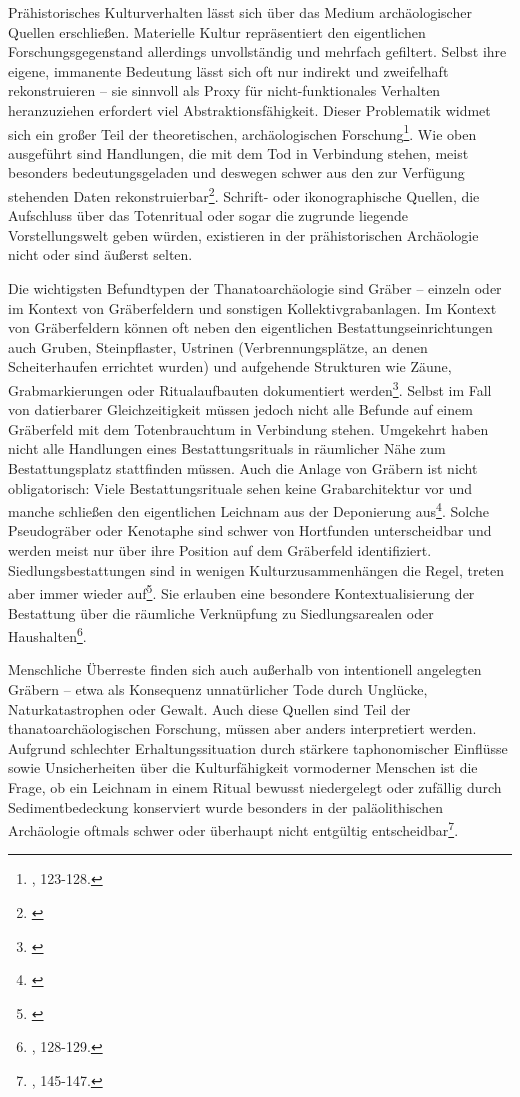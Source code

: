 \documentclass[openany,twoside,twocolumn]{book}
\let\rmarkdownfootnote\footnote%
\def\footnote{\protect\rmarkdownfootnote}
\begin{document}
Prähistorisches Kulturverhalten lässt sich über das Medium
archäologischer Quellen erschließen. Materielle Kultur repräsentiert den
eigentlichen Forschungsgegenstand allerdings unvollständig und mehrfach
gefiltert. Selbst ihre eigene, immanente Bedeutung lässt sich oft nur
indirekt und zweifelhaft rekonstruieren -- sie sinnvoll als Proxy für
nicht-funktionales Verhalten heranzuziehen erfordert viel
Abstraktionsfähigkeit. Dieser Problematik widmet sich ein großer Teil
der theoretischen, archäologischen Forschung\footnote{\textcite{hofmann_rituelle_2008},
  123-128.}. Wie oben ausgeführt sind Handlungen, die mit dem Tod in
Verbindung stehen, meist besonders bedeutungsgeladen und deswegen schwer
aus den zur Verfügung stehenden Daten rekonstruierbar\footnote{\textcite{harke_nature_1997}}.
Schrift- oder ikonographische Quellen, die Aufschluss über das
Totenritual oder sogar die zugrunde liegende Vorstellungswelt geben
würden, existieren in der prähistorischen Archäologie nicht oder sind
äußerst selten.

Die wichtigsten Befundtypen der Thanatoarchäologie sind Gräber --
einzeln oder im Kontext von Gräberfeldern und sonstigen
Kollektivgrabanlagen. Im Kontext von Gräberfeldern können oft neben den
eigentlichen Bestattungseinrichtungen auch Gruben, Steinpflaster,
Ustrinen (Verbrennungsplätze, an denen Scheiterhaufen errichtet wurden)
und aufgehende Strukturen wie Zäune, Grabmarkierungen oder
Ritualaufbauten dokumentiert werden\footnote{\textcite{fischer_vom_1996}}.
Selbst im Fall von datierbarer Gleichzeitigkeit müssen jedoch nicht alle
Befunde auf einem Gräberfeld mit dem Totenbrauchtum in Verbindung
stehen. Umgekehrt haben nicht alle Handlungen eines Bestattungsrituals
in räumlicher Nähe zum Bestattungsplatz stattfinden müssen. Auch die
Anlage von Gräbern ist nicht obligatorisch: Viele Bestattungsrituale
sehen keine Grabarchitektur vor und manche schließen den eigentlichen
Leichnam aus der Deponierung aus\footnote{\textcite{hausler_zur_1975}}.
Solche Pseudogräber oder Kenotaphe sind schwer von Hortfunden
unterscheidbar und werden meist nur über ihre Position auf dem
Gräberfeld identifiziert. Siedlungsbestattungen sind in wenigen
Kulturzusammenhängen die Regel, treten aber immer wieder auf\footnote{\textcite{veit_studien_1998}}.
Sie erlauben eine besondere Kontextualisierung der Bestattung über die
räumliche Verknüpfung zu Siedlungsarealen oder Haushalten\footnote{\textcite{hofmann_rituelle_2008},
  128-129.}.

Menschliche Überreste finden sich auch außerhalb von intentionell
angelegten Gräbern -- etwa als Konsequenz unnatürlicher Tode durch
Unglücke, Naturkatastrophen oder Gewalt. Auch diese Quellen sind Teil
der thanatoarchäologischen Forschung, müssen aber anders interpretiert
werden. Aufgrund schlechter Erhaltungssituation durch stärkere
taphonomischer Einflüsse sowie Unsicherheiten über die Kulturfähigkeit
vormoderner Menschen ist die Frage, ob ein Leichnam in einem Ritual
bewusst niedergelegt oder zufällig durch Sedimentbedeckung konserviert
wurde besonders in der paläolithischen Archäologie oftmals schwer oder
überhaupt nicht entgültig entscheidbar\footnote{\textcite{hofmann_rituelle_2008},
  145-147.}.
\end{document}
